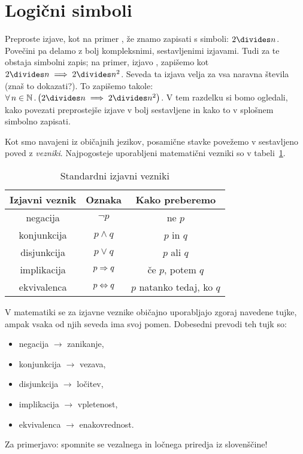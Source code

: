 	
	
	\section{Logični simboli}\label{RAZDELEK: Logični simboli}
	
		Preproste izjave, kot na primer , že znamo zapisati s simboli: $2 \divides n$. Povečini pa delamo z bolj kompleksnimi, sestavljenimi izjavami. Tudi za te obstaja simbolni zapis; na primer, izjavo , zapišemo kot $2 \divides n \implies 2 \divides n^2$. Seveda ta izjava velja za vsa naravna števila (znaš to dokazati?). To zapišemo takole: $\all{n}[\NN]{2 \divides n \implies 2 \divides n^2}$. V tem razdelku si bomo ogledali, kako povezati preprostejše izjave v bolj sestavljene in kako to v splošnem simbolno zapisati.
		
		Kot smo navajeni iz običajnih jezikov, posamične stavke povežemo v sestavljeno poved z \emph{vezniki}. Najpogosteje uporabljeni matematični vezniki so v tabeli~\ref{TABELA: Standardni izjavni vezniki}.
		
		\begin{table}[!ht]
			\centering
			\begin{tabular}{|ccc|}
				\hline
				\textbf{Izjavni veznik} & \textbf{Oznaka} & \textbf{Kako preberemo} \\
				\hline
				negacija & $\lnot{p}$ & ne $p$ \\
				konjunkcija & $p \land q$ & $p$ in $q$ \\
				disjunkcija & $p \lor q$ & $p$ ali $q$ \\
				implikacija & $p \Rightarrow q$ & če $p$, potem $q$ \\
				ekvivalenca & $p \Leftrightarrow q$ & $p$ natanko tedaj, ko $q$ \\
				\hline
			\end{tabular}
			\caption{Standardni izjavni vezniki}\label{TABELA: Standardni izjavni vezniki}
		\end{table}
		
		\begin{opomba}
			V matematiki se za izjavne veznike običajno uporabljajo zgoraj navedene tujke, ampak vsaka od njih seveda ima svoj pomen. Dobesedni prevodi teh tujk so:
			\begin{itemize}
				\item
					negacija $\to$ zanikanje,
				\item
					konjunkcija $\to$ vezava,
				\item
					disjunkcija $\to$ ločitev,
				\item
					implikacija $\to$ vpletenost,
				\item
					ekvivalenca $\to$ enakovrednost.
			\end{itemize}
			Za primerjavo: spomnite se vezalnega in ločnega priredja iz slovenščine!
		\end{opomba}
		
